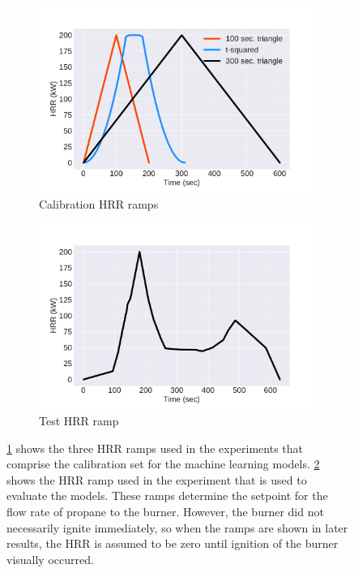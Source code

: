 \documentclass{article}
\begin{document}
\begin{figure}[htbp]
  \centering
  \begin{subfigure}[t]{.45\textwidth}
      \centering
      \includegraphics[width=\textwidth,keepaspectratio]{figures/training_ramps.pdf}
      \caption{Calibration HRR ramps}
      \label{fig:training_ramps}
  \end{subfigure}
  \begin{subfigure}[t]{.45\textwidth}
      \centering
      \includegraphics[width=\textwidth ,keepaspectratio]{figures/test_ramp.pdf}
      \caption{Test HRR ramp}
      \label{fig:test_ramp}
  \end{subfigure}
  \caption{\protect\ref{fig:training_ramps} shows the three HRR ramps used in the experiments that comprise the calibration set for the machine learning models. \protect\ref{fig:test_ramp} shows the HRR ramp used in the experiment that is used to evaluate the models. These ramps determine the setpoint for the flow rate of propane to the burner. However, the burner did not necessarily ignite immediately, so when the ramps are shown in later results, the HRR is assumed to be zero until ignition of the burner visually occurred. }
  \label{fig:hrr_ramps}
\end{figure}
\end{document}
